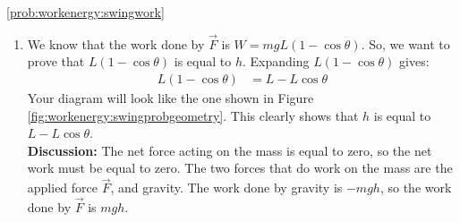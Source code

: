 \begin{solution}{\ref{prob:workenergy:swingwork}}
\begin{enumerate}[label=\alph*)]
\begin{align*}
&=\int_0^{\theta_1}(mg\tan\theta)(\cos\theta)Ld\theta\\
&=\int_0^{\theta_1}(mgL)\frac{\sin\theta}{\cos\theta}\cos\theta d\theta\\
&=\int_0^{\theta_1}(mgL)\sin\theta d\theta\\
\end{align*}
Now we can pull $mgL$ in front of the integral (because they are constants) and integrate: 
\begin{align*}
W&=mgL\int_0^{\theta_1}\sin\theta d\theta\\
&=mgL(-\cos\theta\vert_0^{\theta_1})\\
W&=mgL(1-\cos\theta)
\end{align*}
$\therefore$ the work done by you on the child is equal to $mgL(1-\cos\theta)$. 
\item We know that the work done by $\vec F$ is $W=mgL(1-\cos\theta)$. So, we want to prove that $L(1-\cos\theta)$ is equal to $h$. Expanding $L(1-\cos\theta)$ gives:
\begin{align*}
L(1-\cos\theta)&=L-L\cos\theta
\end{align*}
Your diagram will look like the one shown in Figure \ref{fig:workenergy:swingprobgeometry}. 
This clearly shows that $h$ is equal to $L-L\cos\theta$.\\

\textbf{Discussion:} The net force acting on the mass is equal to zero, so the net work must be equal to zero. The two forces that do work on the mass are the applied force $\vec F$, and gravity. The work done by gravity is $-mgh$, so the work done by $\vec F$ is $mgh$. 
\end{enumerate}
\end{solution}


